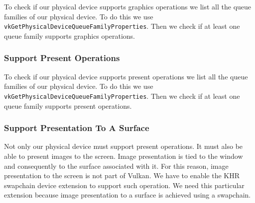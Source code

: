 To check if our physical device supports graphics operations we list all
the queue families of our physical device.
To do this we use \texttt{vkGetPhysicalDeviceQueueFamilyProperties}.
Then we check if at least one queue family supports graphics operations.

\begin{minipage}{\linewidth}{\noindent}
    
\end{minipage}

\subsubsection{Support Present Operations}

To check if our physical device supports present operations we list all
the queue families of our physical device.
To do this we use \texttt{vkGetPhysicalDeviceQueueFamilyProperties}.
Then we check if at least one queue family supports present operations.

\begin{minipage}{\linewidth}{\noindent}
    
\end{minipage}

\subsubsection{Support Presentation To A Surface}

Not only our physical device must support present operations.
It must also be able to present images to the screen.
Image presentation is tied to the window and consequently to the surface
associated with it.
For this reason, image presentation to the screen is not part of Vulkan.
We have to enable the KHR swapchain device extension to support such operation.
We need this particular extension because image presentation to a surface is
achieved using a swapchain.

\begin{minipage}{\linewidth}{\noindent}
    
\end{minipage}

